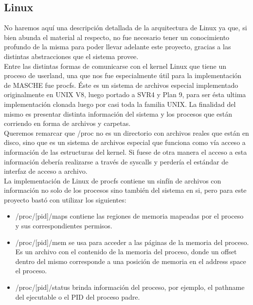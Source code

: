 \subsection{Linux}

No haremos aquí una descripción detallada de la arquitectura de Linux ya que, si bien abunda el
material al respecto, no fue necesario tener un conocimiento profundo de la misma para
poder llevar adelante este proyecto, gracias a las distintas abstracciones que
el sistema provee.\\

Entre las distintas formas de comunicarse con el kernel Linux que tiene un
proceso de userland, una que nos fue especialmente útil para la implementación
de MASCHE fue procfs. Éste es un sistema de archivos especial implementado
originalmente en UNIX V8, luego portado a SVR4 y Plan 9, para ser ésta ultima
implementación clonada luego por casi toda la familia UNIX. La finalidad del
mismo es presentar distinta información del sistema y los procesos que están
corriendo en forma de archivos y carpetas.\\

Queremos remarcar que /proc no es un directorio con archivos reales que están
en disco, sino que es un sistema de archivos especial que funciona como vía
acceso a información de las estructuras del kernel. Si fuese de otra manera el
acceso a esta información debería realizarse a través de syscalls y perdería el
estándar de interfaz de acceso a archivo.\\

La implementación de Linux de procfs contiene un sinfín de archivos con
información no solo de los procesos sino también del sistema en si, pero para
este proyecto bastó con utilizar los siguientes:\\

\begin{itemize}

\item /proc/[pid]/maps contiene las regiones de memoria mapeadas por el proceso
    y sus correspondientes permisos.

\item /proc/[pid]/mem se usa para acceder a las páginas de la memoria del
    proceso. Es un archivo con el contenido de la memoria del proceso, donde un
    offset dentro del mismo corresponde a una posición de memoria en el address
    space el proceso.

\item /proc/[pid]/status brinda información del proceso, por ejemplo, el
    pathname del ejecutable o el PID del proceso padre.

\end{itemize}
